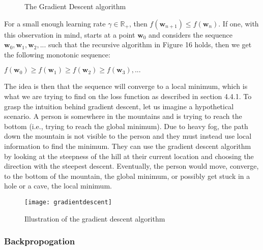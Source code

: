 \documentclass[titlepage]{article}
\begin{document}
\vskip 0.3cm

\begin{figure}[h]
    \centerline{}
    \vskip 0.2cm
    \caption{The Gradient Descent algorithm}
\end{figure}

\vskip 0.3cm

\noindent
For a small enough learning rate $\gamma \in \mathbb{R}_{+}$, then  $f(\mathbf{w}_{n+1}) \leq f(\mathbf{w}_{n})$. If one, with this observation in mind, starts at a point $\mathbf{w}_{0}$ and considers the sequence $\mathbf{w}_{0}, \mathbf{w}_{1}, \mathbf{w}_{2}, ...$ such that the recursive algorithm in Figure 16 holds, then we get the following monotonic sequence:

\vskip 0.5cm

\centerline{$f(\mathbf{w}_{0}) \geq f(\mathbf{w}_{1}) \geq f(\mathbf{w}_{2}) \geq f(\mathbf{w}_{3}), ...$}

\vskip 0.5cm

\noindent
The idea is then that the sequence will converge \cite{skansi} to a local minimum, which is what we are trying to find on the loss function as described in section 4.4.1. To grasp the intuition behind gradient descent, let us imagine a hypothetical scenario. A person is somewhere in the mountains and is trying to reach the bottom (i.e., trying to reach the global minimum). Due to heavy fog, the path down the mountain is not visible to the person and they must instead use local information to find the minimum. They can use the gradient descent algorithm by looking at the steepness of the hill at their current location and choosing the direction with the steepest descent. Eventually, the person would move, converge, to the bottom of the mountain, the global minimum, or possibly get stuck in a hole or a cave, the local minimum.

\begin{figure}[h]
    \center
    \texttt{[image: gradientdescent]}
    \caption{\scriptsize Illustration of the gradient descent algorithm}
\end{figure}

\newpage

\subsubsection{Backpropogation}

\vskip 0.2cm
\end{document}
